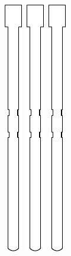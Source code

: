 \documentclass[openany]{book}
\begin{document}
\begin{figure}[!ht]
	\centering
	\begin{subfigure}{.4\textwidth}
		\centering
		\includegraphics[width=.05\textwidth]{images/transmission-result-9.pdf}\, 
		\includegraphics[width=.05\textwidth]{images/transmission-result-9.pdf}\,
		\includegraphics[width=.05\textwidth]{images/transmission-result-9.pdf}\,

\end{subfigure}
\end{figure}
\end{document}
